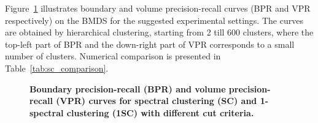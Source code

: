 Figure~\ref{fig:seg_res} illustrates boundary and volume precision-recall curves (BPR and VPR respectively) on the BMDS for the suggested experimental settings. 
The curves are obtained by hierarchical clustering, 
starting from 2 till 600 clusters, where the top-left part of BPR and the down-right part of VPR corresponds to a small number of clusters. 
Numerical comparison is presented in Table~\ref{tab:sc_comparison}.
\begin{figure}[htbp]
\centering
{}
\quad

\caption[Boundary precision-recall (BPR) and volume precision-recall (VPR) curves for spectral clustering (SC) and 1-spectral clustering (1SC) with different cut criteria]{
{\bf Boundary precision-recall (BPR) and volume precision-recall (VPR) curves for spectral clustering (SC) and 1-spectral clustering (1SC) with different cut criteria.}}
\label{fig:seg_res}
\end{figure}

